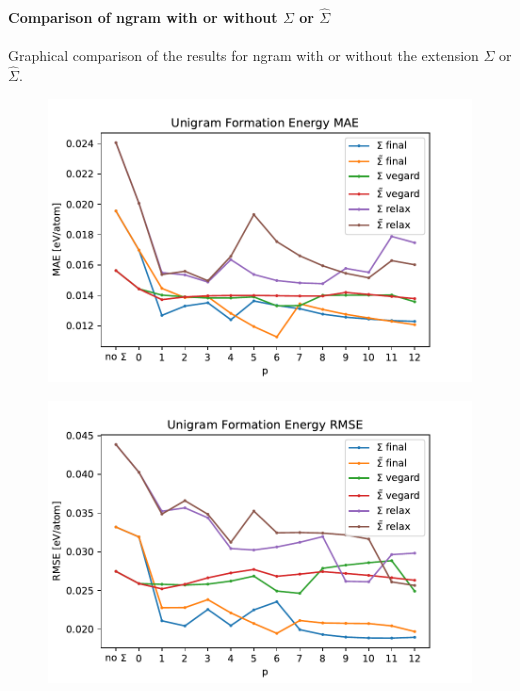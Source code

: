 \documentclass[11pt,oneside,czech,american]{book} %
\theoremstyle{definition} %
\theoremstyle{definition}
\begin{document}
\paragraph{Comparison of ngram with or without $\Sigma$ or $\hat{\Sigma}$}
Graphical comparison of the results for ngram with or without the extension $\Sigma$ or $\hat{\Sigma}$.
\begin{figure}[H]
	\centering
	\includegraphics[scale=0.6]{unigram_MAE_form.pdf}
	\caption{}
	\label{}
\end{figure}
\begin{figure}[H]
	\centering
	\includegraphics[scale=0.6]{unigram_RMSE_form.pdf}
	\caption{}
	\label{}
\end{figure}
\end{document}
